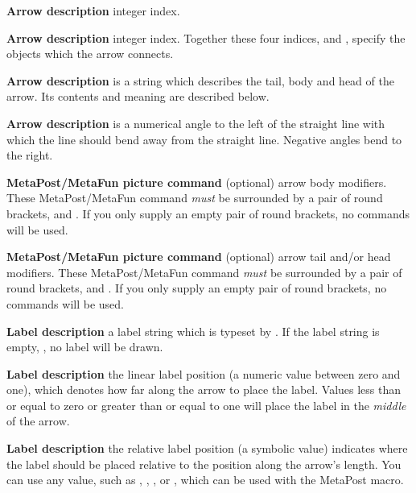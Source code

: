 \item {\bf Arrow description }  integer index. 

\item {\bf Arrow description }  integer index. Together these 
four indices,  and , specify 
the objects which the arrow connects. 

\item {\bf Arrow description }  is a string which 
describes the tail, body and head of the arrow. Its contents and meaning 
are described below. 

\item {\bf Arrow description }  is a numerical angle to the 
left of the straight line with which the line should bend away from the 
straight line. Negative angles bend to the right. 

\item {\bf MetaPost/MetaFun picture command} (optional) arrow body 
modifiers. These MetaPost/MetaFun command \emph{must} be surrounded by a 
pair of round brackets,  and . If you only supply an 
empty pair of round brackets, no commands will be used. 

\item {\bf MetaPost/MetaFun picture command} (optional) arrow tail and/or 
head modifiers. These MetaPost/MetaFun command \emph{must} be surrounded 
by a pair of round brackets,  and . If you only supply 
an empty pair of round brackets, no commands will be used. 

\item {\bf Label description} a label string which is typeset by \ConTeXt. 
If the label string is empty, , no label will be drawn.

\item {\bf Label description} the linear label position (a numeric value 
between zero and one), which denotes how far along the arrow to place the 
label. Values less than or equal to zero or greater than or equal to one 
will place the label in the \emph{middle} of the arrow. 

\item {\bf Label description} the relative label position (a symbolic 
value) indicates where the label should be placed relative to the position 
along the arrow's length. You can use any value, such as , 
, , or , which can be used with the MetaPost 
 macro. 

